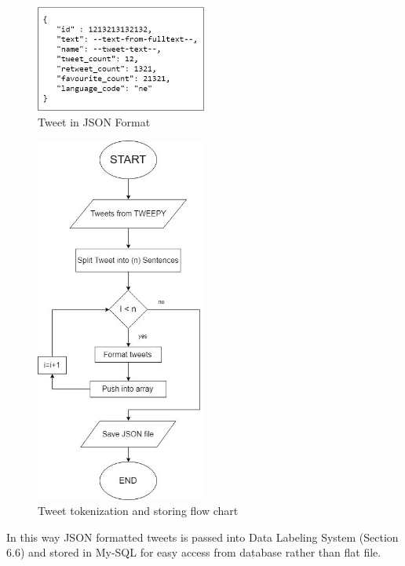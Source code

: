         \begin{figure}[hbt!]
            \centering
             \includegraphics[width=0.5\textwidth]{./img/6.2.jpg}
                \caption{Tweet in JSON Format}
        \end{figure}
        \begin{figure}[hbt!]
            \centering
             \includegraphics[width=00.5\textwidth]{./img/6.3.jpg}
                \caption{Tweet tokenization and storing flow chart}
        \end{figure}
In this way JSON formatted tweets is passed into Data Labeling System (Section 6.6)
and stored in My-SQL for easy access from database rather than flat file.
